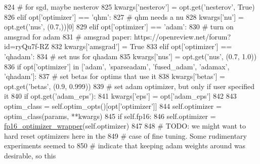 \begin{DoxyCode}
824                 \textcolor{comment}{# for sgd, maybe nesterov}
825                 kwargs[\textcolor{stringliteral}{'nesterov'}] = opt.get(\textcolor{stringliteral}{'nesterov'}, \textcolor{keyword}{True})
826             \textcolor{keywordflow}{elif} opt[\textcolor{stringliteral}{'optimizer'}] == \textcolor{stringliteral}{'qhm'}:
827                 \textcolor{comment}{# qhm needs a nu}
828                 kwargs[\textcolor{stringliteral}{'nu'}] = opt.get(\textcolor{stringliteral}{'nus'}, (0.7,))[0]
829         \textcolor{keywordflow}{elif} opt[\textcolor{stringliteral}{'optimizer'}] == \textcolor{stringliteral}{'adam'}:
830             \textcolor{comment}{# turn on amsgrad for adam}
831             \textcolor{comment}{# amsgrad paper: https://openreview.net/forum?id=ryQu7f-RZ}
832             kwargs[\textcolor{stringliteral}{'amsgrad'}] = \textcolor{keyword}{True}
833         \textcolor{keywordflow}{elif} opt[\textcolor{stringliteral}{'optimizer'}] == \textcolor{stringliteral}{'qhadam'}:
834             \textcolor{comment}{# set nus for qhadam}
835             kwargs[\textcolor{stringliteral}{'nus'}] = opt.get(\textcolor{stringliteral}{'nus'}, (0.7, 1.0))
836         \textcolor{keywordflow}{if} opt[\textcolor{stringliteral}{'optimizer'}] \textcolor{keywordflow}{in} [\textcolor{stringliteral}{'adam'}, \textcolor{stringliteral}{'sparseadam'}, \textcolor{stringliteral}{'fused\_adam'}, \textcolor{stringliteral}{'adamax'}, \textcolor{stringliteral}{'qhadam'}]:
837             \textcolor{comment}{# set betas for optims that use it}
838             kwargs[\textcolor{stringliteral}{'betas'}] = opt.get(\textcolor{stringliteral}{'betas'}, (0.9, 0.999))
839             \textcolor{comment}{# set adam optimizer, but only if user specified it}
840             \textcolor{keywordflow}{if} opt.get(\textcolor{stringliteral}{'adam\_eps'}):
841                 kwargs[\textcolor{stringliteral}{'eps'}] = opt[\textcolor{stringliteral}{'adam\_eps'}]
842 
843         optim\_class = self.optim\_opts()[opt[\textcolor{stringliteral}{'optimizer'}]]
844         self.optimizer = optim\_class(params, **kwargs)
845         \textcolor{keywordflow}{if} self.fp16:
846             self.optimizer = \hyperlink{namespaceparlai_1_1utils_1_1torch_acd34433af9f43b196920120e6009494e}{fp16\_optimizer\_wrapper}(self.optimizer)
847 
848         \textcolor{comment}{# TODO: we might want to hard reset optimizers here in the}
849         \textcolor{comment}{# case of fine tuning. Some rudimentary experiments seemed to}
850         \textcolor{comment}{# indicate that keeping adam weights around was desirable, so this}

\end{DoxyCode}
